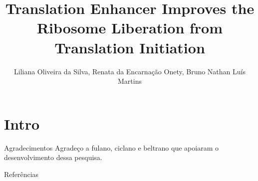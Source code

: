 \documentclass[11pt]{beamer}
\title[Apresentação Parcial]{Translation Enhancer Improves the Ribosome Liberation from Translation Initiation}
\author[Silva, L. O.]{
Liliana Oliveira da Silva, Renata da Encarnação Onety, Bruno Nathan Luís Martins}
\begin{document}


\section{Intro}


\begin{frame}{Agradecimentos}
    \large{Agradeço a fulano, ciclano e beltrano que apoiaram o desenvolvimento dessa pesquisa.}
\end{frame}


\nocite{*}
\begin{frame}[allowframebreaks]{Referências}


\end{frame}


\begin{frame}
\titlepage 
\end{frame}
\end{document}
